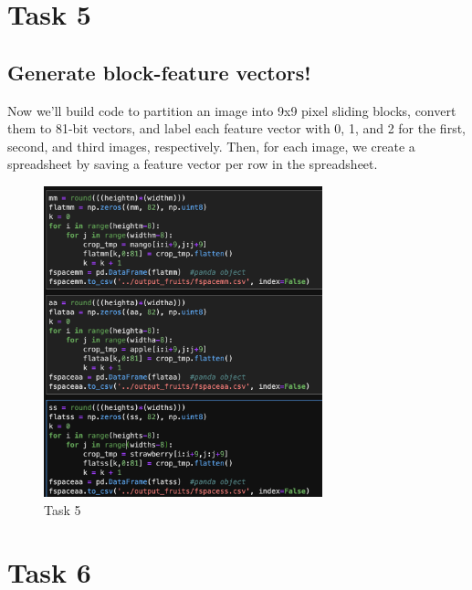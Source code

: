 \documentclass[conference]{IEEEtran}
\begin{document}
\section{Task 5}
\subsection{Generate block-feature vectors!}
Now we'll build code to partition an image into 9x9 pixel sliding blocks, convert them to 81-bit vectors, and label each feature vector with 0, 1, and 2 for the first, second, and third images, respectively. Then, for each image, we create a spreadsheet by saving a feature vector per row in the spreadsheet. \\
\begin{figure}[!htbp]
    \centering
    \includegraphics[height=9cm]{task5.png} 
    \caption{Task 5 }
  \label{fig:mangoGray-Resized }
    
\end{figure}


\section{Task 6}
\end{document}
